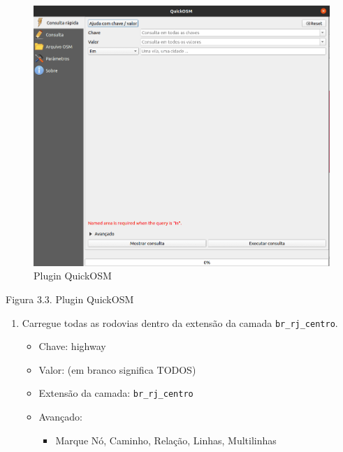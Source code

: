 \documentclass[
]{krantz}
\providecommand{\tightlist}{%
  \setlength{\itemsep}{0pt}\setlength{\parskip}{0pt}}
\begin{document}
\begin{figure}
\centering
\includegraphics{media/modulo3/quickosm-2.png}
\caption{Plugin QuickOSM}
\end{figure}

Figura 3.3. Plugin QuickOSM

\begin{enumerate}
\def\labelenumi{\arabic{enumi}.}
\setcounter{enumi}{3}
\item
  Carregue todas as rodovias dentro da extensão da camada \texttt{br\_rj\_centro}.

  \begin{itemize}
  \tightlist
  \item
    Chave: highway
  \item
    Valor: (em branco significa TODOS)
  \item
    Extensão da camada: \texttt{br\_rj\_centro}
  \item
    Avançado:

    \begin{itemize}
    \tightlist
    \item
      Marque Nó, Caminho, Relação, Linhas, Multilinhas
    \end{itemize}
  \end{itemize}
\end{enumerate}
\end{document}
